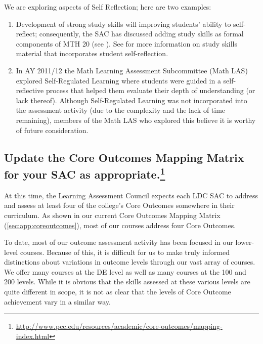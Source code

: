 \begin{description}
	      We are exploring aspects of Self Reflection; here are two examples:
	      \begin{enumerate}
		      \item Development of strong study skills will improving students' ability to self-reflect; consequently, the SAC has discussed adding study skills as formal components of MTH 20 (see ).
		            See  for more information on study skills material that incorporates student self-reflection.
		      \item In AY 2011/12 the Math Learning Assessment Subcommittee (Math LAS) explored Self-Regulated Learning where students were guided in a self-reflective process that helped them evaluate their depth of understanding (or lack thereof).
		            Although Self-Regulated Learning was not incorporated into the assessment activity (due to the complexity and the lack of time remaining), members of the Math LAS who explored this believe it is worthy of future consideration.
	      \end{enumerate}
\end{description}

\subsection[Core Outcomes Mapping Matrix]{Update the Core Outcomes Mapping Matrix for your SAC as
	appropriate.\footnote{\url{http://www.pcc.edu/resources/academic/core-outcomes/mapping-index.html}}}
At this time, the Learning Assessment Council expects each LDC SAC to address and assess at least four of the college's Core Outcomes somewhere in their curriculum.
As shown in our current Core Outcomes Mapping Matrix (\vref{sec:app:coreoutcomes}), most of our courses address four Core Outcomes.

To date, most of our outcome assessment activity has been focused in our lower-level courses.
Because of this, it is difficult for us to make truly informed distinctions about variations in outcome levels through our vast array of courses.
We offer many courses at the DE level as well as many courses at the 100 and 200 levels.
While it is obvious that the skills assessed at these various levels are quite different in scope, it is not as clear that the levels of Core Outcome achievement vary in a similar way.


